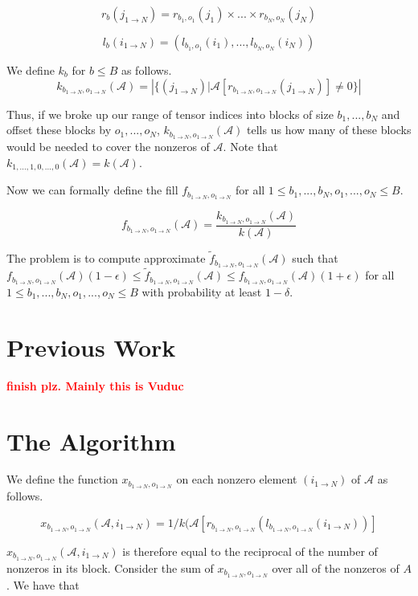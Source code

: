 \documentclass[12pt]{article}
\newcommand{\todo}[1] {\textbf{\textcolor{red}{#1}}}
\newcommand{\Ten}[1] {\mathbf{\mathcal{#1}}}
\begin{document}
    \[
      r_b(j_{1 \to N}) = r_{b_1, o_1}(j_1) \times ... \times r_{b_N, o_N}(j_N)
    \]

    \[
      l_b(i_{1 \to N}) = (l_{b_1, o_1}(i_1), ..., l_{b_N, o_N}(i_N))
    \]

    We define $k_b$ for $b \leq B$ as follows.
    \[
      k_{b_{1 \to N}, o_{1 \to N}}(\Ten{A}) = \left|\{(j_{1 \to N}) | \Ten{A}[r_{b_{1 \to N}, o_{1 \to N}}(j_{1 \to N})] \neq 0\}\right|
    \]

    Thus, if we broke up our range of tensor indices into blocks of size $b_1, ..., b_N$ and offset these blocks by $o_1, ..., o_N$, $k_{b_{1 \to N}, o_{1 \to N}}(\Ten{A})$ tells us how many of these blocks would be needed to cover the nonzeros of $\Ten{A}$. Note that $k_{1, ..., 1, 0, ..., 0}(\Ten{A}) = k(\Ten{A})$.

    Now we can formally define the fill $f_{b_{1 \to N}, o_{1 \to N}}$ for all $1 \leq b_1, ..., b_N, o_1, ..., o_N \leq B$.

    \[
      f_{b_{1 \to N}, o_{1 \to N}}(\Ten{A}) = \frac{k_{b_{1 \to N}, o_{1 \to N}}(\Ten{A})}{k(\Ten{A})}
    \]

    The problem is to compute approximate $\tilde{f}_{b_{1 \to N}, o_{1 \to N}}(\Ten{A})$ such that $f_{b_{1 \to N}, o_{1 \to N}}(\Ten{A})(1 - \epsilon) \leq \tilde{f}_{b_{1 \to N}, o_{1 \to N}}(\Ten{A}) \leq f_{b_{1 \to N}, o_{1 \to N}}(\Ten{A})(1 + \epsilon)$ for all $1 \leq b_1, ..., b_N, o_1, ..., o_N \leq B$ with probability at least $1 - \delta$.
  \section{Previous Work}
    \todo{finish plz. Mainly this is Vuduc}

  \section{The Algorithm}

    We define the function $x_{b_{1 \to N}, o_{1 \to N}}$ on each nonzero element $(i_{1 \to N})$ of $\Ten{A}$ as follows.

    \[
      x_{b_{1 \to N}, o_{1 \to N}}(\Ten{A}, i_{1 \to N}) = 1/k(\Ten{A}[r_{b_{1 \to N}, o_{1 \to N}}(l_{b_{1 \to N}, o_{1 \to N}}(i_{1 \to N}))]
    \]

    $x_{b_{1 \to N}, o_{1 \to N}}(\Ten{A}, i_{1 \to N})$ is therefore equal to the reciprocal of the number of nonzeros in its block. Consider the sum of $x_{b_{1 \to N}, o_{1 \to N}}$ over all of the nonzeros of $A$. We have that
\end{document}
